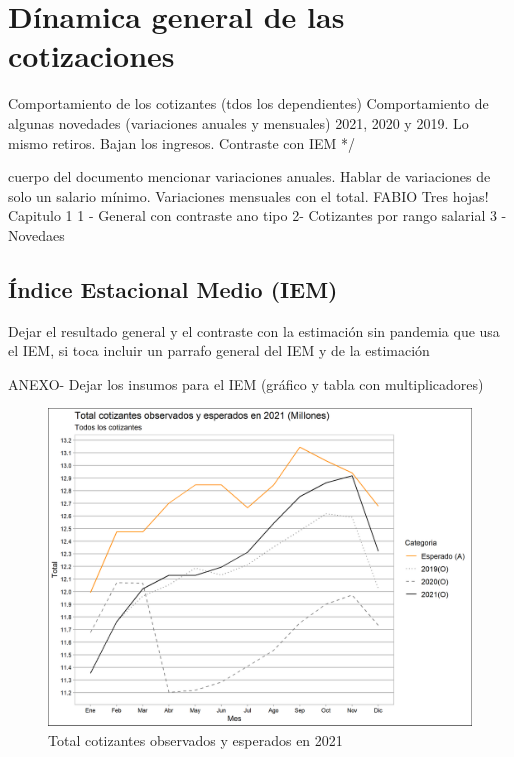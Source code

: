 \section{Dínamica general de las cotizaciones}
Comportamiento de los cotizantes (tdos los dependientes)
Comportamiento de algunas novedades  (variaciones anuales y mensuales) 2021, 2020 y 2019. Lo mismo retiros. Bajan los ingresos. Contraste con IEM */

cuerpo del documento mencionar variaciones anuales. Hablar de variaciones de solo un salario mínimo. 
 Variaciones mensuales con el total.
FABIO 
Tres hojas!  Capitulo 1 
1 - General con contraste ano tipo
2- Cotizantes por rango salarial
3 - Novedaes

\subsection{Índice Estacional Medio (IEM)}
Dejar el resultado general y el contraste con la estimación sin pandemia que usa el IEM, si toca incluir un parrafo general del IEM y de la estimación%

ANEXO- Dejar los insumos para el IEM (gráfico y tabla con multiplicadores)%

\begin{figure}
\label{fig:Cap22:Novedad_1}%
\includegraphics[width = 12.5cm]{figures/Capitulo_2_1/grafico_tot_1_1_1.png}
\caption{Total cotizantes observados y esperados en 2021}
\label{figura:IEM_Total}
\end{figure}
\lipsum[2-3]

\begin{intemize}
\item 
\end{intemize}

